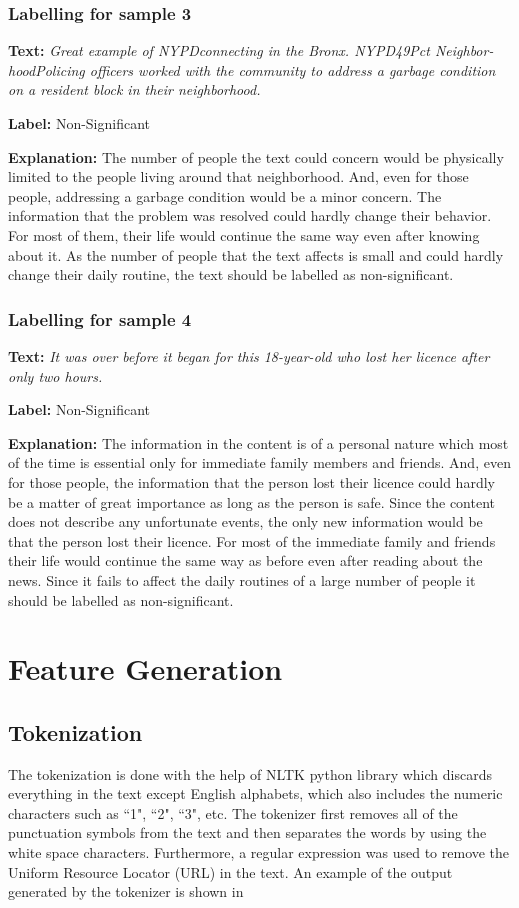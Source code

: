 \subsubsection{Labelling for sample 3}
\textbf{Text:}
\textit{Great example of NYPDconnecting in the Bronx. NYPD49Pct Neighbor- hoodPolicing officers worked with the community to address a garbage condition on a resident block in their neighborhood.}\par
\textbf{Label:} Non-Significant\par
\textbf{Explanation:} The number of people the text could concern would be physically limited to the people living around that neighborhood. And, even for those people, addressing a garbage condition would be a minor concern. The information that the problem was resolved could hardly change their behavior. For most of them, their life would continue the same way even after knowing about it. As the number of people that the text affects is small and could hardly change their daily routine, the text should be labelled as non-significant.

\subsubsection{Labelling for sample 4}
\textbf{Text:}
\textit{It was over before it began for this 18-year-old who lost her licence after only two hours.}\par
\textbf{Label:} Non-Significant\par
\textbf{Explanation:} The information in the content is of a personal nature which most of the time is essential only for immediate family members and friends. And, even for those people, the information that the person lost their licence could hardly be a matter of great importance as long as the person is safe. Since the content does not describe any unfortunate events, the only new information would be that the person lost their licence. For most of the immediate family and friends their life would continue the same way as before even after reading about the news. Since it fails to affect the daily routines of a large number of people it should be labelled as non-significant.

\section{Feature Generation}
\subsection{Tokenization}
The tokenization is done with the help of NLTK\cite{loper2002nltk} python library which discards everything in the text except English alphabets, which also includes the numeric characters such as ``1", ``2", ``3", etc.  The tokenizer first removes all of the punctuation symbols from the text and then separates the words by using the white space characters. Furthermore, a regular expression was used to remove the Uniform Resource Locator (URL) in the text. An example of the output generated by the tokenizer is shown in 

